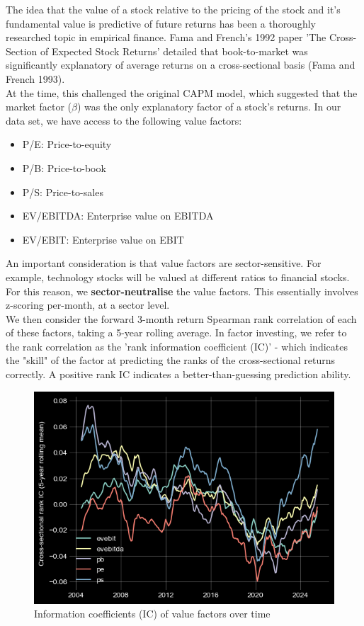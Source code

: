 \documentclass[12pt]{article}
\begin{document}
The idea that the value of a stock relative to the pricing of the stock and it's fundamental value is 
predictive of future returns has been a thoroughly researched topic in empirical finance. Fama and French's 
1992 paper 'The Cross-Section of Expected Stock Returns' detailed that book-to-market was significantly 
explanatory of average returns on a cross-sectional basis (Fama and French 1993).
\newline \\
At the time, this challenged the original CAPM model, which suggested that the market factor ($\beta$)
was the only explanatory factor of a stock's returns. In our data set, we have access to the following
value factors:
\begin{itemize}
    \item P/E: Price-to-equity
    \item P/B: Price-to-book
    \item P/S: Price-to-sales
    \item EV/EBITDA: Enterprise value on EBITDA
    \item EV/EBIT: Enterprise value on EBIT
\end{itemize}
An important consideration is that value factors are sector-sensitive. For example, technology stocks 
will be valued at different ratios to financial stocks. For this reason, we \textbf{sector-neutralise}
the value factors. This essentially involves z-scoring per-month, at a sector level.
\newline \\
We then consider the forward 3-month return Spearman rank correlation of each of these factors,
taking a 5-year rolling average. In factor investing, we refer to the rank correlation as the 'rank information coefficient (IC)' - which indicates the "skill" of the factor at predicting the ranks of 
the cross-sectional returns correctly. A positive rank IC indicates a better-than-guessing prediction
ability.
\begin{figure}[H]
    \centering
    \includegraphics[width=13cm]{./static/value_factor_ic.png}
    \caption{Information coefficients (IC) of value factors over time}
    \label{fig:value_factor_ic}
\end{figure}
\end{document}
